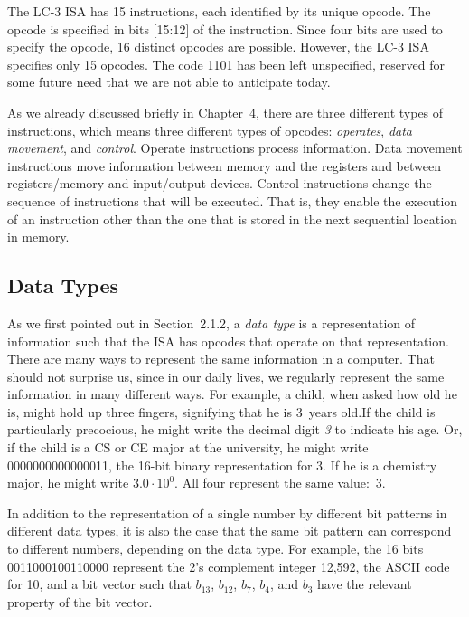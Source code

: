 \documentclass{patt}
\begin{document}
The LC-3 ISA has 15 instructions, each identified by its unique
opcode. The opcode is specified in bits [15:12] of the instruction.
Since four bits are used to specify the opcode, 16 distinct opcodes
are possible. However, the LC-3 ISA specifies only 15 opcodes. The
code 1101 has been left unspecified, reserved for some future need
that we are not able to anticipate today.

As we already discussed briefly in Chapter~4, there are three different 
types of instructions, which means three
different types of opcodes: {\em operates}, {\em data movement}, and
{\em control}. Operate instructions process information. Data
movement instructions move information between memory and the
registers and between registers/memory and input/output devices.
Control instructions change the sequence of instructions that will
be executed. That is, they enable the execution of an instruction
other than the one that is stored in the next sequential location in memory.

\subsection{Data Types}

As we first pointed out in Section~2.1.2, a {\em data type} is a 
representation of information such that the ISA has opcodes that operate 
on that representation. There are many ways to represent the same information 
in a computer. That should not surprise us, since in our daily lives, we 
regularly represent the same information in many different ways. For example, 
a child, when asked how old he is, might hold up three fingers, signifying that
he is 3~years old.\lightbulb[-33pt] If the child is particularly precocious,
he might write the decimal digit {\em 3} to indicate his age. Or,
if the child is a CS or CE major at the university, he might write
0000000000000011, the 16-bit binary representation for 3. If he
is a chemistry major, he might write $3.0 \cdot 10^0$. All four
represent the same value:~3.

In addition to the representation of a single number by different bit patterns 
in different data types, it is also the case that the same bit pattern 
can correspond to different numbers, depending on the data type.  
For example, the 16 bits 0011000100110000
represent the 2's complement integer 12,592, the ASCII code for 10, and a bit
vector such that $b_13$, $b_12$, $b_7$, $b_4$, and $b_3$ have the relevant
property of the bit vector.  
\end{document}
